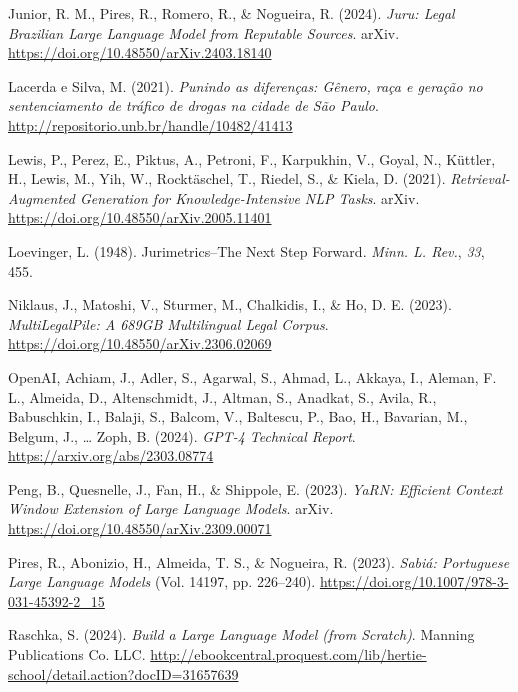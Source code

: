 \documentclass[
  12pt,
]{article}
\newlength{\cslhangindent}
\newenvironment{CSLReferences}[2] %
 {\begin{list}{}{%
  \setlength{\itemindent}{0pt}
  \setlength{\leftmargin}{0pt}
  \setlength{\parsep}{0pt}
  \ifodd #1
   \setlength{\leftmargin}{\cslhangindent}
   \setlength{\itemindent}{-1\cslhangindent}
  \fi
  \setlength{\itemsep}{#2\baselineskip}}}
 {\end{list}}
\begin{document}
\begin{CSLReferences}{1}{0}
Junior, R. M., Pires, R., Romero, R., \& Nogueira, R. (2024).
\emph{Juru: {Legal} {Brazilian} {Large} {Language} {Model} from
{Reputable} {Sources}}. arXiv.
\url{https://doi.org/10.48550/arXiv.2403.18140}

Lacerda e Silva, M. (2021). \emph{Punindo as diferenças: {Gênero}, raça
e geração no sentenciamento de tráfico de drogas na cidade de {São}
{Paulo}}. \url{http://repositorio.unb.br/handle/10482/41413}

Lewis, P., Perez, E., Piktus, A., Petroni, F., Karpukhin, V., Goyal, N.,
Küttler, H., Lewis, M., Yih, W., Rocktäschel, T., Riedel, S., \& Kiela,
D. (2021). \emph{Retrieval-{Augmented} {Generation} for
{Knowledge}-{Intensive} {NLP} {Tasks}}. arXiv.
\url{https://doi.org/10.48550/arXiv.2005.11401}

Loevinger, L. (1948). Jurimetrics--{The} {Next} {Step} {Forward}.
\emph{Minn. L. Rev.}, \emph{33}, 455.

Niklaus, J., Matoshi, V., Sturmer, M., Chalkidis, I., \& Ho, D. E.
(2023). \emph{{MultiLegalPile}: {A} {689GB} {Multilingual} {Legal}
{Corpus}}. \url{https://doi.org/10.48550/arXiv.2306.02069}

OpenAI, Achiam, J., Adler, S., Agarwal, S., Ahmad, L., Akkaya, I.,
Aleman, F. L., Almeida, D., Altenschmidt, J., Altman, S., Anadkat, S.,
Avila, R., Babuschkin, I., Balaji, S., Balcom, V., Baltescu, P., Bao,
H., Bavarian, M., Belgum, J., \ldots{} Zoph, B. (2024). \emph{{GPT}-4
{Technical} {Report}}. \url{https://arxiv.org/abs/2303.08774}

Peng, B., Quesnelle, J., Fan, H., \& Shippole, E. (2023). \emph{{YaRN}:
{Efficient} {Context} {Window} {Extension} of {Large} {Language}
{Models}}. arXiv. \url{https://doi.org/10.48550/arXiv.2309.00071}

Pires, R., Abonizio, H., Almeida, T. S., \& Nogueira, R. (2023).
\emph{Sabiá: {Portuguese} {Large} {Language} {Models}} (Vol. 14197, pp.
226--240). \url{https://doi.org/10.1007/978-3-031-45392-2_15}

Raschka, S. (2024). \emph{Build a {Large} {Language} {Model} (from
{Scratch})}. Manning Publications Co. LLC.
\url{http://ebookcentral.proquest.com/lib/hertie-school/detail.action?docID=31657639}


\end{CSLReferences}
\end{document}

